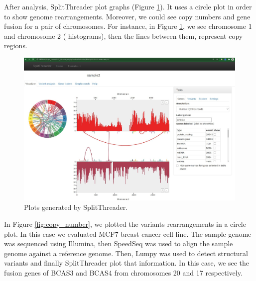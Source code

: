 \documentclass{svproc}
\begin{document}
After analysis, SplitThreader plot graphs (Figure \ref{fig:split_threader_2}). It uses a circle plot in order to show genome rearrangements. Moreover, we could see copy numbers and gene fusion for a pair of chromosomes. For instance, in Figure \ref{fig:split_threader_2}, we see chromosome 1 and chromosome 2 ( histograms), then the lines between them, represent copy regions.\\

\begin{figure}[H]
	\centering
	\includegraphics[width=\textwidth]{img/splitthreader/split_threader_2}
	\caption{Plots generated by SplitThreader.}
	\label{fig:split_threader_2}
\end{figure}

In Figure \ref{fig:copy_number}, we plotted the variants rearrangements in a circle plot. In this case we evaluated MCF7 breast cancer cell line. The sample genome was sequenced using Illumina, then SpeedSeq was used to align the sample genome against a reference genome. Then, Lumpy was used to detect structural variants and finally SplitThreader plot that information. In this case, we see the fusion genes of BCAS3 and BCAS4 from chromosomes 20 and 17 respectively. 
\end{document}
